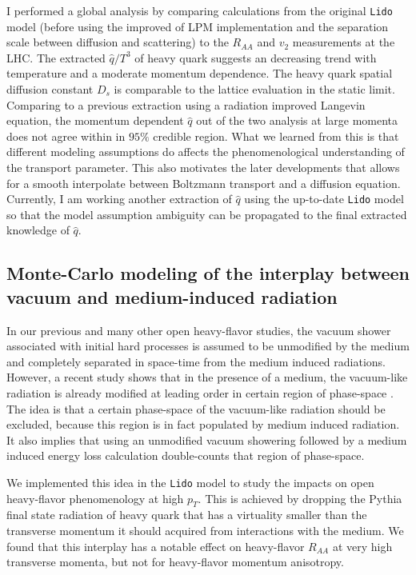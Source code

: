 \documentclass[10pt,a4paper]{article}
\begin{document}
I performed a global analysis by comparing calculations from the original {\tt Lido} model (before using the improved of LPM implementation and the separation scale between diffusion and scattering) to the $R_{AA}$ and $v_{2}$ measurements at the LHC. 
The extracted $\hat{q}/T^3$ of heavy quark suggests an decreasing trend with temperature and a moderate momentum dependence.
The heavy quark spatial diffusion constant $D_s$ is comparable to the lattice evaluation in the static limit.
Comparing to a previous extraction using a radiation improved Langevin equation, the momentum dependent $\hat{q}$ out of the two analysis at large momenta does not agree within in $95\%$ credible region.
What we learned from this is that different modeling assumptions do affects the phenomenological understanding of the transport parameter.
This also motivates the later developments that allows for a smooth interpolate between Boltzmann transport and a diffusion equation.
Currently, I am working another extraction of $\hat{q}$ using the up-to-date {\tt Lido} model so that the model assumption ambiguity can be propagated to the final extracted knowledge of $\hat{q}$.

\subsection{Monte-Carlo modeling of the interplay between vacuum and medium-induced radiation}

In our previous and many other open heavy-flavor studies, the vacuum shower associated with initial hard processes is assumed to be unmodified by the medium and completely separated in space-time from the medium induced radiations. 
However, a recent study shows that in the presence of a medium, the vacuum-like radiation is already modified at leading order in certain region of phase-space \cite{Caucal:2018dla}. 
The idea is that a certain phase-space of the vacuum-like radiation should be excluded, because this region is in fact populated by medium induced radiation.
It also implies that using an unmodified vacuum showering followed by a medium induced energy loss calculation double-counts that region of phase-space.

We implemented this idea in the {\tt Lido} model to study the impacts on open heavy-flavor phenomenology at high $p_T$.
This is achieved by dropping the Pythia final state radiation of heavy quark that has a virtuality smaller than the transverse momentum it should acquired from interactions with the medium.
We found that this interplay has a notable effect on heavy-flavor $R_{AA}$ at very high transverse momenta, but not for heavy-flavor momentum anisotropy.
\end{document}
